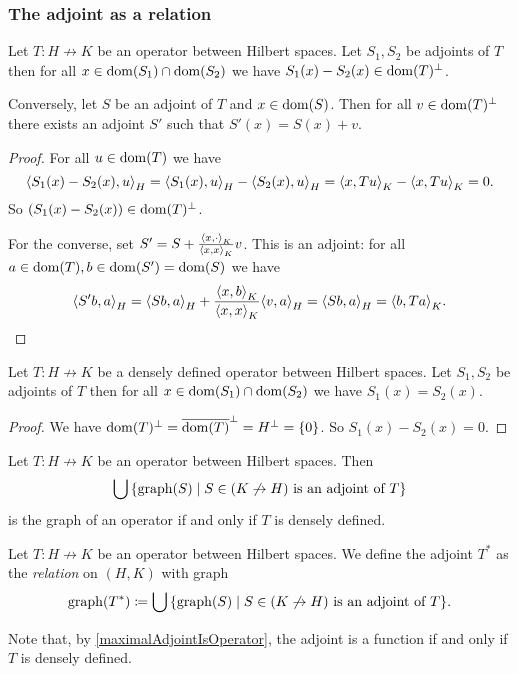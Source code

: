 \subsubsection{The adjoint as a relation}
\begin{lemma}
Let $T: H\not\to K$ be an operator between Hilbert spaces. Let $S_1, S_2$ be adjoints of $T$ then for all $x\in \operatorname{dom}(S_1)\cap\operatorname{dom}(S_2)$ we have $S_1(x) - S_2(x) \in \operatorname{dom}(T)^\perp$.

Conversely, let $S$ be an adjoint of $T$ and $x\in\operatorname{dom}(S)$. Then for all $v\in \operatorname{dom}(T)^\perp$ there exists an adjoint $S'$ such that $S'(x) = S(x) + v$.
\end{lemma}
\begin{proof}
For all $u\in \operatorname{dom}(T)$ we have
\[ \inner{S_1(x) - S_2(x), u}_H = \inner{S_1(x), u}_H - \inner{S_2(x), u}_H = \inner{x, Tu}_K - \inner{x, Tu}_K = 0. \]
So $(S_1(x) - S_2(x)) \in \operatorname{dom}(T)^\perp$.

For the converse, set $S' = S + \frac{\inner{x,\cdot}_K}{\inner{x,x}_K}v$. This is an adjoint: for all $a\in \operatorname{dom}(T), b\in \operatorname{dom}(S') = \operatorname{dom}(S)$ we have
\[  \inner{S' b,a}_H = \inner{Sb, a}_H + \frac{\inner{x,b}_K}{\inner{x,x}_K}\inner{v,a}_H = \inner{Sb, a}_H = \inner{b,Ta}_K. \]
\end{proof}
\begin{corollary} \label{agreementAdjoints}
Let $T: H\not\to K$ be a densely defined operator between Hilbert spaces. Let $S_1, S_2$ be adjoints of $T$ then for all $x\in \operatorname{dom}(S_1)\cap\operatorname{dom}(S_2)$ we have $S_1(x) = S_2(x)$.
\end{corollary}
\begin{proof}
We have $\operatorname{dom}(T)^\perp = \overline{\operatorname{dom}(T)}^\perp = H^\perp = \{0\}$. So $S_1(x) - S_2(x) = 0$.
\end{proof}
\begin{corollary} \label{maximalAdjointIsOperator}
Let $T: H\not\to K$ be an operator between Hilbert spaces. Then
\[ \bigcup\setbuilder{\graph(S)}{\text{$S\in (K\not\to H)$ is an adjoint of $T$}} \]
is the graph of an operator \textup{if and only if} $T$ is densely defined.
\end{corollary}

\begin{definition}
Let $T: H\not\to K$ be an operator between Hilbert spaces. We define the adjoint $T^*$ as the \emph{relation} on $(H,K)$ with graph
\[ \graph(T^*) \defeq \bigcup\setbuilder{\graph(S)}{\text{$S\in (K\not\to H)$ is an adjoint of $T$}}. \]
\end{definition}
Note that, by \ref{maximalAdjointIsOperator}, the adjoint is a function if and only if $T$ is densely defined.

